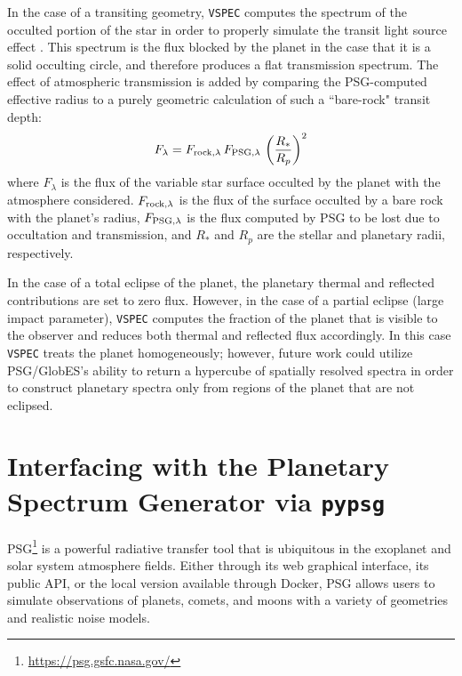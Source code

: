 \documentclass[twocolumn]{aastex631}
\newcommand{\vspec}[1]{\texttt{VSPEC}#1}
\begin{document}
In the case of a transiting geometry, \vspec{} computes the spectrum of the occulted portion of the star in order to properly simulate the transit light source effect \citep[TLS][]{rackham2018}. This spectrum is the flux blocked by the planet in the case that it is a solid occulting circle, and therefore produces a flat transmission spectrum. The effect of atmospheric transmission is added by comparing the PSG-computed effective radius to a purely geometric calculation of such a ``bare-rock" transit depth:
\begin{equation}
    F_{\lambda} = F_{{\rm rock}, \lambda}\, F_{{\rm PSG,} \lambda} \,\left (\frac{R_*}{R_p} \right )^2
\end{equation}
where $F_\lambda$ is the flux of the variable star surface occulted by the planet with the atmosphere considered. $F_{{\rm rock}, \lambda}$ is the flux of the surface occulted by a bare rock with the planet's radius, $F_{{\rm PSG,} \lambda}$ is the flux computed by PSG to be lost
due to occultation and transmission, and $R_*$ and $R_p$ are the stellar and planetary radii, respectively.

In the case of a total eclipse of the planet, the planetary thermal and reflected contributions are set to zero flux. However, in the case of a partial eclipse (large impact parameter), \vspec{} computes the fraction of the planet that is visible to the observer and reduces both thermal and reflected flux accordingly. In this case \vspec{} treats the planet homogeneously; however, future work could utilize PSG/GlobES's ability to return a hypercube of spatially resolved spectra in order to construct planetary spectra only from regions of the planet that are not eclipsed.

\section{Interfacing with the Planetary Spectrum Generator via \texttt{pypsg}}
\label{sec:pypsg}

PSG\footnote{\url{https://psg.gsfc.nasa.gov/}} \citep{villanueva2018} is a powerful radiative transfer tool that is ubiquitous in the exoplanet and solar system atmosphere fields. Either through its web graphical interface, its public API, or the local version available through Docker, PSG allows users to simulate observations of planets, comets, and moons with a variety of geometries and realistic noise models.
\end{document}

